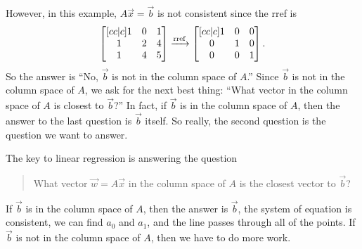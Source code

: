 \begin{example}
However, in this example, $A\vec x=\vec b$ is not consistent since the rref is
\begin{equation*}
\begin{bmatrix}[cc|c]1&0&1\\1&2&4\\1&4&5\end{bmatrix}
\xrightarrow{\operatorname{rref}}
\begin{bmatrix}[cc|c]1&0&0\\0&1&0\\0&0&1\end{bmatrix}.
\end{equation*}
So the answer is ``No, $\vec b$ is not in the column space of $A$.''  Since $\vec b$ is not in the column space of $A$, we ask for the next best thing: ``What vector in the column space of $A$ is closest to $\vec b$?''  In fact, if $\vec b$ is in the column space of $A$, then the answer to the last question is $\vec b$ itself.  So really, the second question is the question we want to answer.  

The key to linear regression is answering the question
\begin{quote}
  What vector $\vec w=A\vec x$ in the column space of $A$ is the closest vector to $\vec b$?
\end{quote}
If $\vec b$ is in the column space of $A$, then the answer is $\vec b$, the system of equation is consistent, we can find $a_0$ and $a_1$, and the line passes through all of the points.  If $\vec b$ is not in the column space of $A$, then we have to do more work.

\marginpar{ \begin{center} \begin{tikzpicture}[x={(0.3cm,0.7cm)},y={(1cm,-0.2cm)},z={(-.5cm,1cm)}]
      \coordinate (origin) at (0,0,0);
      \coordinate (u) at  (1,1,1);
      \coordinate (v) at  (0,2,4);
      \coordinate (b) at  (1,4,5);
      \coordinate (w) at  ($4/3*(u)+(v)$);
      \coordinate (bprime) at ($3*(b)-3*(w)$); %
      \coordinate (r) at ($(b)-(w)$);
    
      \fill[->,fill=lightgray] (origin) -- ($4/3*(u)$) -- (w) -- (v) -- cycle;
      \draw[->] (origin) -- (u);
      \draw[->] (origin) -- (v);
      \draw[->] (origin) -- node[below right, pos=0.9] {$\vec b$} (b) ;
      \draw[->] (origin) -- (u);
      \draw[->] (origin) -- node[left,pos=0.7] {$\vec w$} (w);
      \draw[->] (w) -- node[above right] {$\vec r$} (b);
      

      \draw[thin] ($0.95*(w)$) -- ($0.95*(w)+0.2*(r)$) -- ($(w)+0.2*(r)$);
 \end{tikzpicture}
\end{center}%

}
\end{example}
